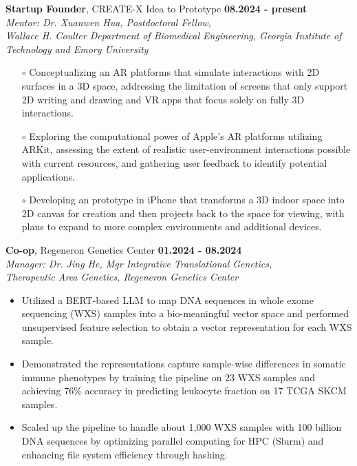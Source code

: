 \documentclass[letterpaper, 10pt]{article}
\newcommand{\subsectionvspace}{\vspace{6pt}}
\begin{document}
    \textbf{Startup Founder},
    CREATE-X Idea to Prototype \hfill \textbf{08.2024 - present} \\
    \textit{
        Mentor: Dr. Xuanwen Hua, 
        Postdoctoral Fellow, \\
        Wallace H. Coulter Department of Biomedical Engineering,
        Georgia Institute of Technology and Emory University
    }
    \begin{itemize}
        \item[$\circ$] Conceptualizing an AR platforms that simulate interactions with 2D surfaces in a 3D space, addressing the limitation of screens that only support 2D writing and drawing and VR apps that focus solely on fully 3D interactions.
        \item[$\circ$] Exploring the computational power of Apple's AR platforms utilizing ARKit, assessing the extent of realistic user-environment interactions possible with current resources, and gathering user feedback to identify potential applications. 
        \item[$\circ$] Developing an prototype in iPhone that transforms a 3D indoor space into 2D canvas for creation and then projects back to the space for viewing, with plans to expand to more complex environments and additional devices.
    \end{itemize}

    \subsectionvspace

    \textbf{Co-op}, 
    Regeneron Genetics Center \hfill \textbf{01.2024 - 08.2024} \\
    \textit{
        Manager: Dr. Jing He, 
        Mgr Integrative Translational Genetics, \\
        Therapeutic Area Genetics,
        Regeneron Genetics Center
    }
    \begin{itemize}
        \item Utilized a BERT-based LLM to map DNA sequences in whole exome sequencing (WXS) samples into a bio-meaningful vector space and performed unsupervised feature selection to obtain a vector representation for each WXS sample.
        \item Demonstrated the representations capture sample-wise differences in somatic immune phenotypes by training the pipeline on 23 WXS samples and achieving 76\% accuracy in predicting leukocyte fraction on 17 TCGA SKCM samples.
        \item Scaled up the pipeline to handle about 1,000 WXS samples with 100 billion DNA sequences by optimizing parallel computing for HPC (Slurm) and enhancing file system efficiency through hashing.
    \end{itemize}
\end{document}
